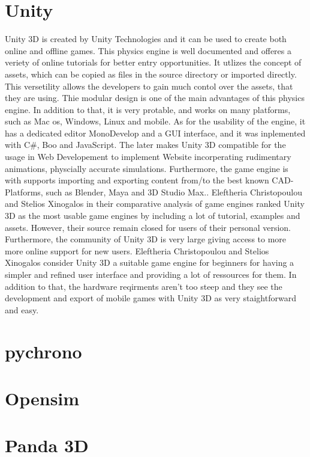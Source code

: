 \documentclass[
	12pt, 
	a4paper, 
]{article}
\begin{document}
	\section{Unity}
	Unity 3D is created by Unity Technologies and it can be used to create both online and offline games. This physics engine is well documented and offeres a veriety of online tutorials for better entry opportunities. It utlizes the concept of assets, which can be copied as files in the source directory or imported directly. This versetility allows the developers to gain much contol over the assets, that they are using. Thie modular design is one of the main advantages of this physics engine. In addition to that, it is very protable, and works on many platforms, such as Mac os, Windows, Linux and mobile.\cite{mat2014using}\newline
	As for the usability of the engine, it has a dedicated editor MonoDevelop and a GUI interface, and it was inplemented with C\#, Boo and JavaScript.\cite{christopoulou2017overview} The later makes Unity 3D compatible for the usage in Web Developement to implement Website incorperating rudimentary animations, physcially accurate simulations. Furthermore, the game engine is with supports importing and exporting content from/to the best known CAD-Platforms, such as Blender, Maya and 3D Studio Max.\cite{christopoulou2017overview}.\newline
	Eleftheria Christopoulou and Stelios Xinogalos in their comparative analysis of game engines ranked Unity 3D as the most usable game engines by including a lot of tutorial, examples and assets. However, their source remain closed for users of their personal version. Furthermore, the community of Unity 3D is very large giving access to more more online support for new users\cite{christopoulou2017overview}. Eleftheria Christopoulou and Stelios Xinogalos consider Unity 3D a suitable game engine for beginners for having a simpler and refined user interface and providing a lot of ressources for them. In addition to that, the hardware reqirments aren't too steep and they see the development and export of mobile games with Unity 3D as very staightforward and easy\cite{christopoulou2017overview}.
	\section{pychrono}
	\section{Opensim}
	\section{Panda 3D}
	\printbibliography
\end{document}
